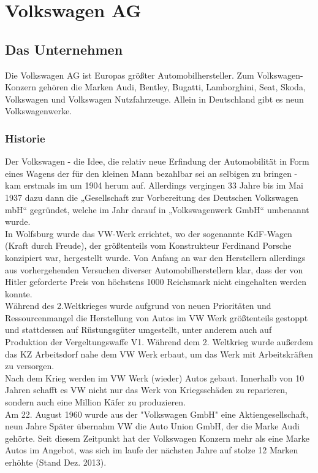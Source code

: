 \documentclass[12pt]{article}
\begin{document}
\section{Volkswagen AG}
\subsection{Das Unternehmen}
Die Volkswagen AG ist Europas größter Automobilhersteller. Zum Volkswagen-Konzern gehören die Marken Audi, Bentley, Bugatti, Lamborghini, Seat, Skoda, Volkswagen und Volkswagen Nutzfahrzeuge. Allein in Deutschland gibt es neun Volkswagenwerke.
\subsubsection{Historie}
Der Volkswagen - die Idee, die relativ neue Erfindung der Automobilität in Form eines Wagens der für den kleinen Mann bezahlbar sei an selbigen zu bringen - kam erstmals im um 1904 herum auf. Allerdings vergingen 33 Jahre bis im Mai 1937 dazu dann die „Gesellschaft zur Vorbereitung des Deutschen Volkswagen mbH“ gegründet, welche im Jahr darauf in „Volkswagenwerk GmbH“ umbenannt wurde.\cite{vwchronik} \\
In Wolfsburg wurde das VW-Werk errichtet, wo der sogenannte KdF-Wagen (Kraft durch Freude), der größtenteils vom Konstrukteur Ferdinand Porsche konzipiert war, hergestellt wurde. Von Anfang an war den Herstellern allerdings aus vorhergehenden Versuchen diverser Automobilherstellern klar, dass der von Hitler geforderte Preis von höchstens 1000 Reichsmark nicht eingehalten werden konnte. \cite{geschdautos}\\
Während des 2.Weltkrieges wurde aufgrund von neuen Prioritäten und Ressourcenmangel die Herstellung von Autos im VW Werk größtenteils gestoppt und stattdessen auf Rüstungsgüter umgestellt, unter anderem auch auf Produktion der Vergeltungswaffe V1.\cite{autowp} Während dem 2. Weltkrieg wurde außerdem das KZ Arbeitsdorf nahe dem VW Werk erbaut, um das Werk mit Arbeitskräften zu versorgen.\cite{terror}  
\\
Nach dem Krieg werden im VW Werk (wieder) Autos gebaut. Innerhalb von 10 Jahren schafft es VW nicht nur das Werk von Kriegsschäden zu reparieren, sondern auch eine Million Käfer zu produzieren. \cite{ahwest}\\
Am 22. August 1960 wurde aus der "Volkswagen GmbH" eine Aktiengesellschaft, neun Jahre Später übernahm VW die Auto Union GmbH, der die Marke Audi gehörte. Seit diesem Zeitpunkt hat der Volkswagen Konzern mehr als eine Marke Autos im Angebot, was sich im laufe der nächsten Jahre auf stolze 12 Marken erhöhte (Stand Dez. 2013). \cite{vwag}
\end{document}
